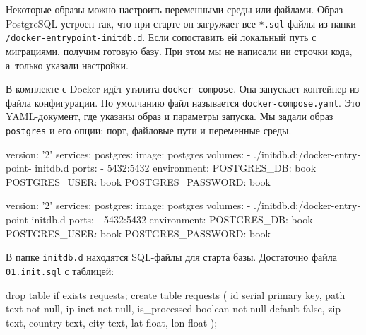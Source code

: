 \mnoindent
Некоторые образы можно настроить переменными среды или файлами. Образ PostgreSQL
устроен так, что при старте он загружает все \verb|*.sql| файлы из папки
\texttt{/docker-entrypoint\--initdb.d}. Если сопоставить ей локальный путь с
миграциями, получим готовую базу. При этом мы не написали ни строчки кода,
а~только указали настройки.


В комплекте с Docker идёт утилита \texttt{docker\--compose}. Она запускает
контейнер из файла конфигурации. По умолчанию файл называется
\verb|docker-compose.yaml|. Это YAML-документ, где указаны образ и параметры
запуска. Мы задали образ \verb|postgres| и его опции: порт, файловые пути и
переменные среды.


\ifnarrow

\begin{english}
  \begin{yaml}
version: '2'
services:
  postgres:
    image: postgres
    volumes:
      - ./initdb.d:/docker-entrypoint-
                                initdb.d
    ports:
      - 5432:5432
    environment:
      POSTGRES_DB: book
      POSTGRES_USER: book
      POSTGRES_PASSWORD: book
  \end{yaml}
\end{english}

\else

\begin{english}
  \begin{yaml}
version: '2'
services:
  postgres:
    image: postgres
    volumes:
      - ./initdb.d:/docker-entrypoint-initdb.d
    ports:
      - 5432:5432
    environment:
      POSTGRES_DB: book
      POSTGRES_USER: book
      POSTGRES_PASSWORD: book
  \end{yaml}
\end{english}

\fi

\mnoindent
В папке \verb|initdb.d| находятся SQL-файлы для старта базы. Достаточно файла
\verb|01.init.sql| с таблицей:


\ifnarrow

\begin{english}
  \begin{sql}
drop table if exists requests;
create table requests (
    id            serial primary key,
    path          text not null,
    ip            inet not null,
    is_processed  boolean not null
                  default false,
    zip           text,
    country       text,
    city          text,
    lat           float,
    lon           float
);
  \end{sql}
\end{english}

